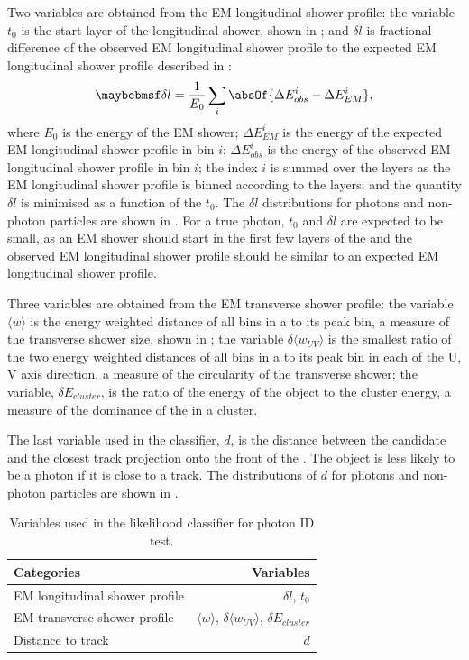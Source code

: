 Two variables are obtained from the EM longitudinal shower profile: the variable $t_0$ is the start layer of the longitudinal shower, shown in ; and $\delta{l}$ is fractional difference of the observed EM longitudinal shower profile to the expected EM longitudinal shower profile described in :
\begin{equation}
\delta l = \frac{1}{E_0}\sum_{i}^{}\absOf{\Delta E_{obs}^i - \Delta E_{EM}^i },
\end{equation}
where $E_0$ is the energy of the EM shower; $\Delta E_{EM}^i$ is the energy of the expected EM longitudinal shower profile in bin $i$;  $\Delta E_{obs}^i$ is the energy of the observed EM longitudinal shower profile in bin $i$; the index $i$ is summed over the \ECAL layers as the EM longitudinal shower profile is binned according to the \ECAL layers; and the quantity $\delta l$ is minimised as a function of the $t_0$. The $\delta l$ distributions for photons and non-photon particles are shown in . For a true photon, $t_0$  and $\delta l $ are expected to be small, as an EM shower should start in the first few layers of the \ECAL and the observed EM longitudinal shower profile should be similar to an expected EM longitudinal shower profile.

Three variables are obtained from the EM transverse  shower profile: the variable $\langle{w}\rangle$ is the energy weighted \rms distance of all bins in a \ShowerPeak to its peak bin, a measure of the transverse shower size, shown in ; the variable $\delta{\langle{w_{UV}}\rangle}$ is the smallest ratio of the two energy weighted \rms distances of all bins in a \ShowerPeak to its peak bin in each of the U, V axis direction, a measure of the circularity of the transverse shower; the variable, $\delta E_{cluster}$, is the  ratio of the energy of the \ShowerPeak object to the cluster energy, a measure of the dominance of the \ShowerPeak in a cluster.

The last variable used in the classifier, $d$, is the distance between the candidate and the closest track projection onto the front of the \ECAL. The \ShowerPeak object is less likely to be a photon if it is close to a track. The distributions of $d$ for photons and non-photon particles are shown in .


\begin{table}[htbp] \centering \smallskip
\begin{tabular}{l r }
\hline
\hline
Categories&  Variables\\
\hline
EM longitudinal  shower profile & $\delta{l}$, $t_0$ \\
EM transverse  shower profile & $\langle{w}\rangle$, $\delta{\langle{w_{UV}}\rangle}$, $\delta E_{cluster}$ \\
Distance to track &  $d$ \\
\hline
\hline
\end{tabular}
\caption
{Variables used in the likelihood classifier for photon ID test.}
\label{tab:photonPhotonIDvar}
\end{table}

